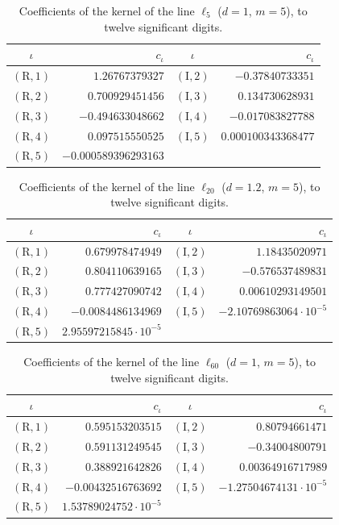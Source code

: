\documentclass[11pt,reqno]{amsart}
\numberwithin{equation}{section}
\theoremstyle{definition}
\theoremstyle{remark}
\begin{document}
\begin{table}[ht]\centering\small
\begin{tabular}{@{}cr@{\quad}cr@{}}\toprule $\iota$ & $c_\iota$ & $\iota$ & $c_\iota$\\\midrule
$(\mathrm R,1)$ & $1.26767379327$ & $(\mathrm I,2)$ & $-0.37840733351$\\
$(\mathrm R,2)$ & $0.700929451456$ & $(\mathrm I,3)$ & $0.134730628931$\\
$(\mathrm R,3)$ & $-0.494633048662$ & $(\mathrm I,4)$ & $-0.017083827788$\\
$(\mathrm R,4)$ & $0.097515550525$ & $(\mathrm I,5)$ & $0.000100343368477$\\
$(\mathrm R,5)$ & $-0.000589396293163$ & & \\
\bottomrule\end{tabular}
\caption{Coefficients of the kernel of the line $\ell_{5}$ ($d=1$, $m=5$), to twelve significant digits.}\label{tab:kernel_L5}\end{table}

\begin{table}[ht]\centering\small
\begin{tabular}{@{}cr@{\quad}cr@{}}\toprule $\iota$ & $c_\iota$ & $\iota$ & $c_\iota$\\\midrule
$(\mathrm R,1)$ & $0.679978474949$ & $(\mathrm I,2)$ & $1.18435020971$\\
$(\mathrm R,2)$ & $0.804110639165$ & $(\mathrm I,3)$ & $-0.576537489831$\\
$(\mathrm R,3)$ & $0.777427090742$ & $(\mathrm I,4)$ & $0.00610293149501$\\
$(\mathrm R,4)$ & $-0.0084486134969$ & $(\mathrm I,5)$ & $-2.10769863064\cdot10^{-5}$\\
$(\mathrm R,5)$ & $2.95597215845\cdot10^{-5}$ & & \\
\bottomrule\end{tabular}
\caption{Coefficients of the kernel of the line $\ell_{20}$ ($d=1.2$, $m=5$), to twelve significant digits.}\label{tab:kernel_L20}\end{table}

\begin{table}[ht]\centering\small
\begin{tabular}{@{}cr@{\quad}cr@{}}\toprule $\iota$ & $c_\iota$ & $\iota$ & $c_\iota$\\\midrule
$(\mathrm R,1)$ & $0.595153203515$ & $(\mathrm I,2)$ & $0.80794661471$\\
$(\mathrm R,2)$ & $0.591131249545$ & $(\mathrm I,3)$ & $-0.34004800791$\\
$(\mathrm R,3)$ & $0.388921642826$ & $(\mathrm I,4)$ & $0.00364916717989$\\
$(\mathrm R,4)$ & $-0.00432516763692$ & $(\mathrm I,5)$ & $-1.27504674131\cdot10^{-5}$\\
$(\mathrm R,5)$ & $1.53789024752\cdot10^{-5}$ & & \\
\bottomrule\end{tabular}
\caption{Coefficients of the kernel of the line $\ell_{60}$ ($d=1$, $m=5$), to twelve significant digits.}\label{tab:kernel_L60}\end{table}
\end{document}
